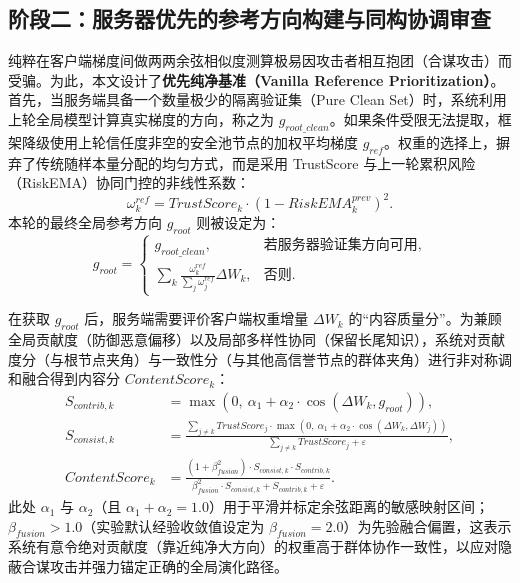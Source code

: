 \documentclass[11pt, a4paper, UTF8, fontset=fandol]{ctexart}
\begin{document}
\subsection{阶段二：服务器优先的参考方向构建与同构协调审查}
纯粹在客户端梯度间做两两余弦相似度测算极易因攻击者相互抱团（合谋攻击）而受骗。为此，本文设计了\textbf{优先纯净基准（Vanilla Reference Prioritization）}。
首先，当服务端具备一个数量极少的隔离验证集（Pure Clean Set）时，系统利用上轮全局模型计算真实梯度的方向，称之为 $g_{root\_clean}$。如果条件受限无法提取，框架降级使用上轮信任度非空的安全池节点的加权平均梯度 $g_{ref}$。权重的选择上，摒弃了传统随样本量分配的均匀方式，而是采用 TrustScore 与上一轮累积风险（RiskEMA）协同门控的非线性系数：
\begin{equation}
    \omega_{k}^{ref} = TrustScore_{k} \cdot (1 - RiskEMA_{k}^{prev})^{2}.
\end{equation}
本轮的最终全局参考方向 $g_{root}$ 则被设定为：
\begin{equation}
    g_{root}=
    \begin{cases}
        g_{root\_clean}, & \text{若服务器验证集方向可用}, \\
        \sum_{k} \frac{\omega_{k}^{ref}}{\sum_j \omega_{j}^{ref}} \Delta W_k, & \text{否则}.
    \end{cases}
\end{equation}

在获取 $g_{root}$ 后，服务端需要评价客户端权重增量 $\Delta W_k$ 的“内容质量分”。为兼顾全局贡献度（防御恶意偏移）以及局部多样性协同（保留长尾知识），系统对贡献度分（与根节点夹角）与一致性分（与其他高信誉节点的群体夹角）进行非对称调和融合得到内容分 $ContentScore_k$：
\begin{align}
    S_{contrib,k} &= \max\left(0,\ \alpha_{1} + \alpha_{2} \cdot \cos(\Delta W_{k}, g_{root})\right), \\
    S_{consist,k} &= \frac{\sum_{j\neq k} TrustScore_{j} \cdot \max\left(0,\ \alpha_{1} + \alpha_{2} \cdot \cos(\Delta W_{k}, \Delta W_{j})\right)}{\sum_{j\neq k} TrustScore_{j} + \varepsilon}, \\
    ContentScore_{k} &= \frac{(1 + \beta_{fusion}^{2}) \cdot S_{consist,k} \cdot S_{contrib,k}}{\beta_{fusion}^{2}\cdot S_{consist,k} + S_{contrib,k} + \varepsilon}.
\end{align}
此处 $\alpha_{1}$ 与 $\alpha_{2}$（且 $\alpha_1 + \alpha_2 = 1.0$）用于平滑并标定余弦距离的敏感映射区间；$\beta_{fusion} > 1.0$（实验默认经验收敛值设定为 $\beta_{fusion}=2.0$）为先验融合偏置，这表示系统有意令绝对贡献度（靠近纯净大方向）的权重高于群体协作一致性，以应对隐蔽合谋攻击并强力锚定正确的全局演化路径。
\end{document}

